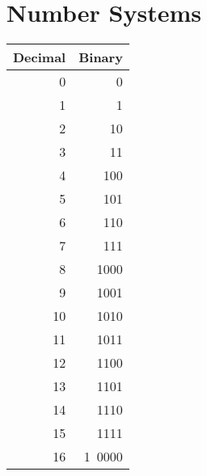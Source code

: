 
\chapter{Number Systems}

\begin{table}[h]
    \begin{tabular}{rr}
        Decimal & Binary\\
        \hline
        0 & 0\\
        1 & 1\\
        2 & 10\\
        3 & 11\\
        4 & 100\\
        5 & 101\\
        6 & 110\\
        7 & 111\\
        8 & 1000\\
        9 & 1001\\
        10 & 1010\\
        11 & 1011\\
        12 & 1100\\
        13 & 1101\\
        14 & 1110\\
        15 & 1111\\
        16 & 1~0000\\
        \hline
    \end{tabular}
\end{table}